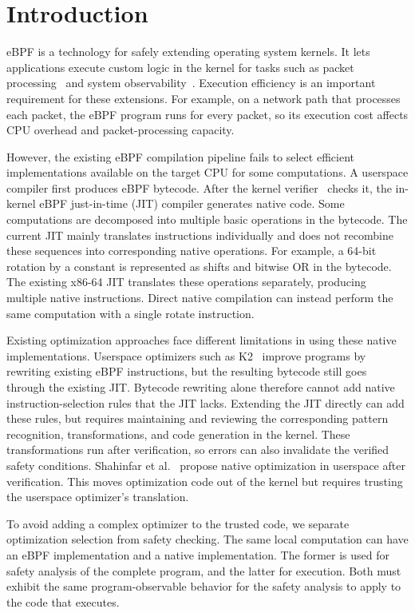 \section{Introduction}
\label{sec:introduction}

eBPF is a technology for safely extending operating system kernels. It lets applications execute custom logic in the kernel for tasks such as packet processing~\cite{katran} and system observability~\cite{bpftrace}. Execution efficiency is an important requirement for these extensions. For example, on a network path that processes each packet, the eBPF program runs for every packet, so its execution cost affects CPU overhead and packet-processing capacity.

However, the existing eBPF compilation pipeline fails to select efficient implementations available on the target CPU for some computations. A userspace compiler first produces eBPF bytecode. After the kernel verifier~\cite{verifier} checks it, the in-kernel eBPF just-in-time (JIT) compiler generates native code. Some computations are decomposed into multiple basic operations in the bytecode. The current JIT mainly translates instructions individually and does not recombine these sequences into corresponding native operations. For example, a 64-bit rotation by a constant is represented as shifts and bitwise OR in the bytecode. The existing x86-64 JIT translates these operations separately, producing multiple native instructions. Direct native compilation can instead perform the same computation with a single rotate instruction.

Existing optimization approaches face different limitations in using these native implementations. Userspace optimizers such as K2~\cite{xu2021synthesizing} improve programs by rewriting existing eBPF instructions, but the resulting bytecode still goes through the existing JIT. Bytecode rewriting alone therefore cannot add native instruction-selection rules that the JIT lacks. Extending the JIT directly can add these rules, but requires maintaining and reviewing the corresponding pattern recognition, transformations, and code generation in the kernel. These transformations run after verification, so errors can also invalidate the verified safety conditions. Shahinfar et al.~\cite{shahinfar2026fun} propose native optimization in userspace after verification. This moves optimization code out of the kernel but requires trusting the userspace optimizer's translation.

To avoid adding a complex optimizer to the trusted code, we separate optimization selection from safety checking. The same local computation can have an eBPF implementation and a native implementation. The former is used for safety analysis of the complete program, and the latter for execution. Both must exhibit the same program-observable behavior for the safety analysis to apply to the code that executes.

